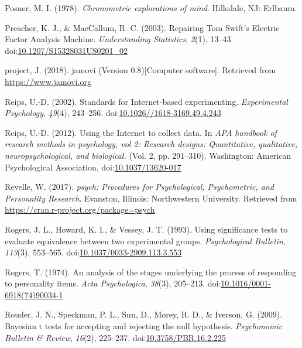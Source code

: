 \documentclass[english,man, mask]{apa6}
\theoremstyle{definition}
\theoremstyle{definition}
\theoremstyle{definition}
\theoremstyle{remark}
\begin{document}
\hypertarget{ref-Posner1978}{}
Posner, M. I. (1978). \emph{Chronometric explorations of mind}.
Hillsdale, NJ: Erlbaum.

\hypertarget{ref-Preacher2003}{}
Preacher, K. J., \& MacCallum, R. C. (2003). Repairing Tom Swift's
Electric Factor Analysis Machine. \emph{Understanding Statistics},
\emph{2}(1), 13--43.
doi:\href{https://doi.org/10.1207/S15328031US0201_02}{10.1207/S15328031US0201\_02}

\hypertarget{ref-jamovi2018}{}
project, J. (2018). jamovi (Version 0.8){[}Computer software{]}.
Retrieved from \url{https://www.jamovi.org}

\hypertarget{ref-Reips2002a}{}
Reips, U.-D. (2002). Standards for Internet-based experimenting.
\emph{Experimental Psychology}, \emph{49}(4), 243--256.
doi:\href{https://doi.org/10.1026//1618-3169.49.4.243}{10.1026//1618-3169.49.4.243}

\hypertarget{ref-Reips2012}{}
Reips, U.-D. (2012). Using the Internet to collect data. In \emph{APA
handbook of research methods in psychology, vol 2: Research designs:
Quantitative, qualitative, neuropsychological, and biological.} (Vol. 2,
pp. 291--310). Washington: American Psychological Association.
doi:\href{https://doi.org/10.1037/13620-017}{10.1037/13620-017}

\hypertarget{ref-Revelle2017}{}
Revelle, W. (2017). \emph{psych: Procedures for Psychological,
Psychometric, and Personality Research}. Evanston, Illinois:
Northwestern University. Retrieved from
\url{https://cran.r-project.org/package=psych}

\hypertarget{ref-Rogers1993}{}
Rogers, J. L., Howard, K. I., \& Vessey, J. T. (1993). Using
significance tests to evaluate equivalence between two experimental
groups. \emph{Psychological Bulletin}, \emph{113}(3), 553--565.
doi:\href{https://doi.org/10.1037/0033-2909.113.3.553}{10.1037/0033-2909.113.3.553}

\hypertarget{ref-Rogers1974}{}
Rogers, T. (1974). An analysis of the stages underlying the process of
responding to personality items. \emph{Acta Psychologica}, \emph{38}(3),
205--213.
doi:\href{https://doi.org/10.1016/0001-6918(74)90034-1}{10.1016/0001-6918(74)90034-1}

\hypertarget{ref-Rouder2009}{}
Rouder, J. N., Speckman, P. L., Sun, D., Morey, R. D., \& Iverson, G.
(2009). Bayesian t tests for accepting and rejecting the null
hypothesis. \emph{Psychonomic Bulletin \& Review}, \emph{16}(2),
225--237.
doi:\href{https://doi.org/10.3758/PBR.16.2.225}{10.3758/PBR.16.2.225}
\end{document}

